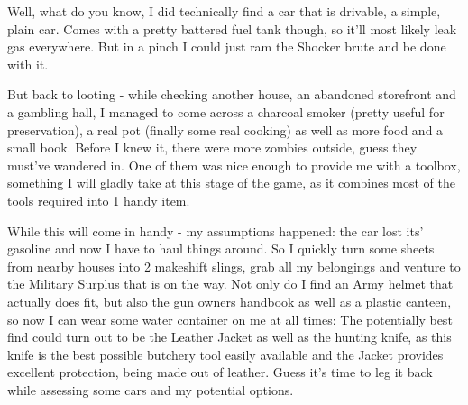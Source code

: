 Well, what do you know, I did technically find a car that is drivable, a simple, plain car. Comes with a pretty battered fuel tank though, so it'll most likely leak gas everywhere. But in a pinch I could just ram the Shocker brute and be done with it.

But back to looting - while checking another house, an abandoned storefront and a gambling hall, I managed to come across a charcoal smoker (pretty useful for preservation), a real pot (finally some real cooking) as well as more food and a small book. Before I knew it, there were more zombies outside, guess they must've wandered in. One of them was nice enough to provide me with a toolbox, something I will gladly take at this stage of the game, as it combines most of the tools required into 1 handy item.

While this will come in handy - my assumptions happened: the car lost its' gasoline and now I have to haul things around. So I quickly turn some sheets from nearby houses into 2 makeshift slings, grab all my belongings and venture to the Military Surplus that is on the way. Not only do I find an Army helmet that actually does fit, but also the gun owners handbook as well as a plastic canteen, so now I can wear some water container on me at all times: The potentially best find could turn out to be the Leather Jacket as well as the hunting knife, as this knife is the best possible butchery tool easily available and the Jacket provides excellent protection, being made out of leather. Guess it's time to leg it back while assessing some cars and my potential options.


